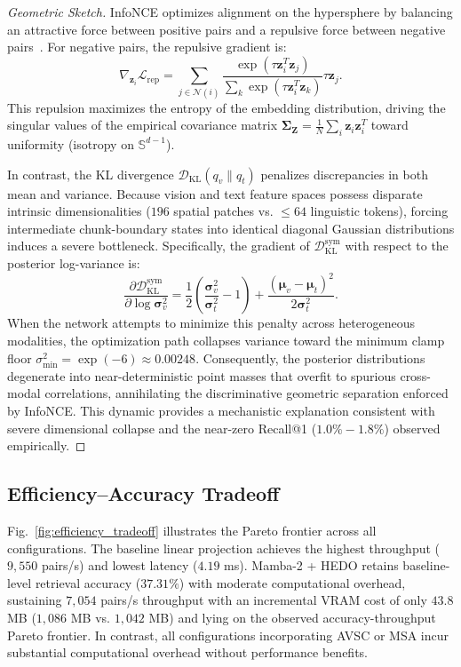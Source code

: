 \documentclass[10pt,journal,final]{IEEEtran}
\begin{document}
\begin{proof}[Geometric Sketch]
InfoNCE optimizes alignment on the hypersphere by balancing an attractive force between positive pairs and a repulsive force between negative pairs~\cite{chen2020simple,jing2022understanding}. For negative pairs, the repulsive gradient is:
\begin{equation}
\label{eq:repulsive_grad}
\nabla_{\mathbf{z}_i} \mathcal{L}_{\mathrm{rep}} = \sum_{j \in \mathcal{N}(i)} \frac{\exp(\tau \mathbf{z}_i^T \mathbf{z}_j)}{\sum_k \exp(\tau \mathbf{z}_i^T \mathbf{z}_k)} \tau \mathbf{z}_j.
\end{equation}
This repulsion maximizes the entropy of the embedding distribution, driving the singular values of the empirical covariance matrix $\boldsymbol{\Sigma}_{\mathbf{Z}} = \frac{1}{N}\sum_i \mathbf{z}_i \mathbf{z}_i^T$ toward uniformity (isotropy on $\mathbb{S}^{d-1}$).

In contrast, the KL divergence $\mathcal{D}_{\mathrm{KL}}(q_v \parallel q_t)$ penalizes discrepancies in both mean and variance. Because vision and text feature spaces possess disparate intrinsic dimensionalities ($196$ spatial patches vs. $\le 64$ linguistic tokens), forcing intermediate chunk-boundary states into identical diagonal Gaussian distributions induces a severe bottleneck. Specifically, the gradient of $\mathcal{D}_{\mathrm{KL}}^{\mathrm{sym}}$ with respect to the posterior log-variance is:
\begin{equation}
\label{eq:logvar_grad}
\frac{\partial \mathcal{D}_{\mathrm{KL}}^{\mathrm{sym}}}{\partial \log \boldsymbol{\sigma}_v^2} = \frac{1}{2}\left( \frac{\boldsymbol{\sigma}_v^2}{\boldsymbol{\sigma}_t^2} - 1 \right) + \frac{(\boldsymbol{\mu}_v - \boldsymbol{\mu}_t)^2}{2\boldsymbol{\sigma}_t^2}.
\end{equation}
When the network attempts to minimize this penalty across heterogeneous modalities, the optimization path collapses variance toward the minimum clamp floor $\sigma_{\min}^2 = \exp(-6) \approx 0.00248$. Consequently, the posterior distributions degenerate into near-deterministic point masses that overfit to spurious cross-modal correlations, annihilating the discriminative geometric separation enforced by InfoNCE. This dynamic provides a mechanistic explanation consistent with severe dimensional collapse and the near-zero Recall@1 ($1.0\%-1.8\%$) observed empirically.
\end{proof}

\subsection{Efficiency--Accuracy Tradeoff}
Fig.~\ref{fig:efficiency_tradeoff} illustrates the Pareto frontier across all configurations. The baseline linear projection achieves the highest throughput ($9,550$ pairs/s) and lowest latency ($4.19$ ms). Mamba-2 + HEDO retains baseline-level retrieval accuracy ($37.31\%$) with moderate computational overhead, sustaining $7,054$ pairs/s throughput with an incremental VRAM cost of only $43.8$ MB ($1,086$ MB vs. $1,042$ MB) and lying on the observed accuracy-throughput Pareto frontier. In contrast, all configurations incorporating AVSC or MSA incur substantial computational overhead without performance benefits.
\end{document}

